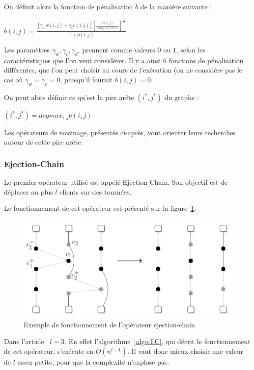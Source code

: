 \documentclass[a4paper,11pt]{article}%
\begin{document}
On définit alors la fonction de pénalisation $b$ de la manière suivante :
\begin{center}
$b(i,j) = \frac{[\gamma_w w(i,j) + \gamma_c c(i,j)] [\frac{d(i,j)}{max_{k,l}d(k,l)}] ^ {\frac{\gamma_d}{2}}}{1+p(i,j)}$
\end{center}

Les paramètres $\gamma_w,\gamma_c,\gamma_d$, prennent comme valeurs $0$ ou $1$, selon les caractéristiques que l'on veut considérer. 
Il y a ainsi 6 fonctions de pénalisation différentes, que l'on peut choisir au cours de l'exécution (on ne considère pas le cas où $\gamma_w = \gamma_c = 0$, puisqu'il fournit $b(i,j) = 0$.

On peut alors définir ce qu'est la pire arête $(i^*,j^*)$ du graphe :

\begin{center}
$ (i^*,j^*) = argmax_{i,j} b(i,j)$
\end{center}

Les opérateurs de voisinage, présentés ci-après, vont orienter leurs recherches autour de cette pire arête.
 
\subsubsection{Ejection-Chain}

Le premier opérateur utilisé est appelé Ejection-Chain. Son objectif est de déplacer au plus $l$ clients sur des tournées. 

Le fonctionnement de cet opérateur est présenté sur la figure~\ref{EC}.

\begin{figure}
\centering
\includegraphics[scale=0.2]{ejection_chain_big.png}
\caption{Exemple de fonctionnement de l'opérateur ejection-chain}
\label{EC}
\end{figure}

Dans l'article~\cite{Sorensen_2017} $l = 3$. En effet l'algorithme~\ref{algo:EC}, qui décrit le fonctionnement de cet opérateur, s'exécute en $O(n^{l-1})$. Il vaut donc mieux choisir une valeur de $l$ assez petite, pour que la complexité n'explose pas. 
\end{document}
